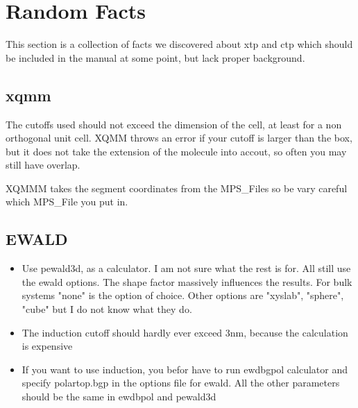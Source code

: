 \section{Random Facts}

This section is a collection of facts we discovered about xtp and ctp which should be included in the manual at some point, but lack proper background.



\subsection{xqmm}

The cutoffs used should not exceed the dimension of the cell, at least for a non orthogonal unit cell. XQMM throws an error if your cutoff is larger than the box, but it does not take the extension of the molecule into accout, so often you may still have overlap.

XQMMM takes the segment coordinates from the MPS_Files so be vary careful which MPS_File you put in.


\subsection{EWALD}


\begin{itemize}
\item Use pewald3d, as a calculator. I am not sure what the rest is for. All still use the ewald options. The shape factor massively influences the results. For bulk systems "none" is the option of choice. Other options are "xyslab", "sphere", "cube" but I do not know what they do.
\item The induction cutoff should hardly ever exceed 3nm, because the calculation is expensive
\item If you want to use induction, you befor have to run ewdbgpol calculator and specify polar\textunderscore top.bgp in the options file for ewald. All the other parameters should be the same in ewdbpol and pewald3d
\end{itemize}
